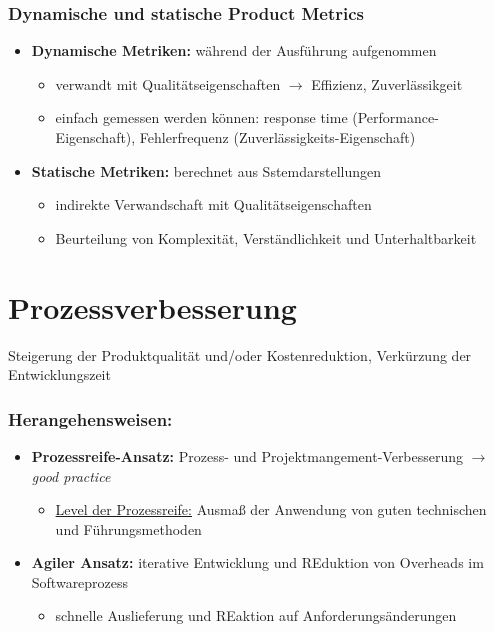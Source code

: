 \subsubsection{Dynamische und statische Product Metrics}
\begin{itemize}
    \item \textbf{Dynamische Metriken:} während der Ausführung aufgenommen
    \begin{itemize}
        \item verwandt mit Qualitätseigenschaften $\rightarrow$ Effizienz, Zuverlässikgeit
        \item einfach gemessen werden können: response time (Performance-Eigenschaft), Fehlerfrequenz (Zuverlässigkeits-Eigenschaft)
    \end{itemize}
    \item \textbf{Statische Metriken:} berechnet aus Sstemdarstellungen
    \begin{itemize}
        \item indirekte Verwandschaft mit Qualitätseigenschaften
        \item Beurteilung von Komplexität, Verständlichkeit und Unterhaltbarkeit
    \end{itemize}
\end{itemize}

\section{Prozessverbesserung}
Steigerung der Produktqualität und/oder Kostenreduktion, Verkürzung der Entwicklungszeit

\subsubsection{Herangehensweisen:}
\begin{itemize}
    \item \textbf{Prozessreife-Ansatz:} Prozess- und Projektmangement-Verbesserung $\rightarrow$ \textit{good practice}
    \begin{itemize}
        \item \underline{Level der Prozessreife:} Ausmaß der Anwendung von guten technischen und Führungsmethoden
    \end{itemize}
    \item \textbf{Agiler Ansatz:} iterative Entwicklung und REduktion von Overheads im Softwareprozess 
    \begin{itemize}
        \item schnelle Auslieferung und REaktion auf Anforderungsänderungen
    \end{itemize}
\end{itemize}

